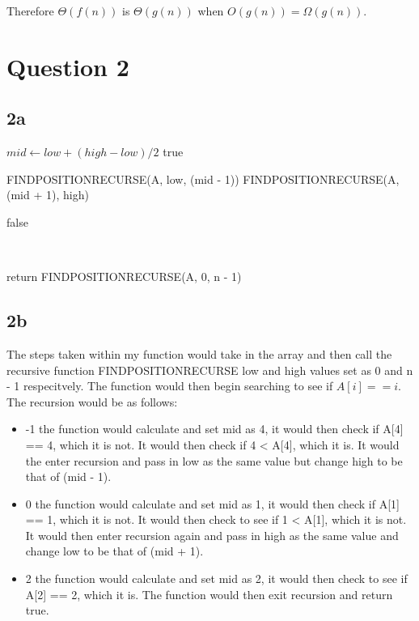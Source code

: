 \documentclass[oneside, a4paper]{article}
\begin{document}
Therefore $\Theta(f(n))$ is $\Theta(g(n))$ when $O(g(n)) = \Omega(g(n))$.

\newpage

\setcounter{secnumdepth}{-1}
\section{Question 2}

\subsection*{2a}
\begin{algorithmic}
            \State $mid \gets low + (high - low) / 2$
                \State \Return true    
            \EndIf
                
                \State \Return FINDPOSITIONRECURSE(A, low, (mid - 1))
            \Else
                \State \Return FINDPOSITIONRECURSE(A, (mid + 1), high)
            \EndIf

        \Else 
            \State \Return false    
        \EndIf
        
    \EndFunction
\end{algorithmic}
\
\
\begin{algorithmic}
        \State return FINDPOSITIONRECURSE(A, 0, n - 1)
    \EndFunction
\end{algorithmic}


\subsection*{2b}
The steps taken within my function would take in the array and then call the recursive function FINDPOSITIONRECURSE low and high values set as 0 and n - 1 respecitvely. The function would then begin searching to see if $A[i] == i$. The recursion would be as follows:

\begin{itemize}
    \item -1 \textrightarrow the function would calculate and set mid as 4, it would then check if A[4] == 4, which it is not. It would then check if 4 < A[4], which it is. It would the enter recursion and pass in low as the same value but change high to be that of (mid - 1). 
    \item 0 \textrightarrow the function would calculate and set mid as 1, it would then check if A[1] == 1, which it is not. It would then check to see if 1 < A[1], which it is not. It would then enter recursion again and pass in high as the same value and change low to be that of (mid + 1). 
    \item 2 \textrightarrow the function would calculate and set mid as 2, it would then check to see if A[2] == 2, which it is. The function would then exit recursion and return true.
\end{itemize}
\end{document}
